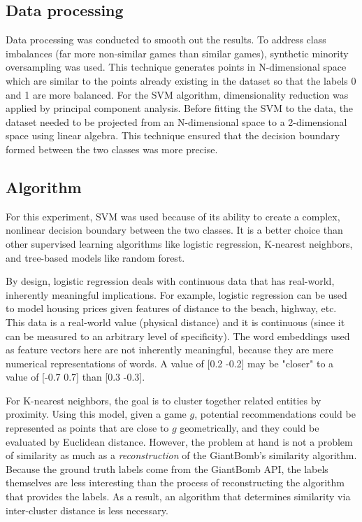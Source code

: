 \documentclass[10pt,twocolumn]{article}
\begin{document}
\subsection{Data processing}
Data processing was conducted to smooth out the results. To address class imbalances (far more non-similar games than similar games), synthetic minority oversampling was used. \cite{NVChawla} This technique generates points in N-dimensional space which are similar to the points already existing in the dataset so that the labels 0 and 1 are more balanced. For the SVM algorithm, dimensionality reduction was applied by principal component analysis. \cite{Joachims} Before fitting the SVM to the data, the dataset needed to be projected from an N-dimensional space to a 2-dimensional space using linear algebra. This technique ensured that the decision boundary formed between the two classes was more precise.

\subsection{Algorithm}
For this experiment, SVM was used because of its ability to create a complex, nonlinear decision boundary between the two classes. \cite{CortesVapnikSVM} It is a better choice than other supervised learning algorithms like logistic regression, K-nearest neighbors, and tree-based models like random forest. 

By design, logistic regression deals with continuous data that has real-world, inherently meaningful implications. For example, logistic regression can be used to model housing prices given features of distance to the beach, highway, etc. This data is a real-world value (physical distance) and it is continuous (since it can be measured to an arbitrary level of specificity). The word embeddings used as feature vectors here are not inherently meaningful, because they are mere numerical representations of words. A value of [0.2 -0.2] may be "closer" to a value of [-0.7 0.7] than [0.3 -0.3]. 

For K-nearest neighbors, the goal is to cluster together related entities by proximity. Using this model, given a game $g$, potential recommendations could be represented as points that are close to $g$ geometrically, and they could be evaluated by Euclidean distance. However, the problem at hand is not a problem of similarity as much as a \textit{reconstruction} of the GiantBomb's similarity algorithm. Because the ground truth labels come from the GiantBomb API, the labels themselves are less interesting than the process of reconstructing the algorithm that provides the labels. As a result, an algorithm that determines similarity via inter-cluster distance is less necessary.
\end{document}
